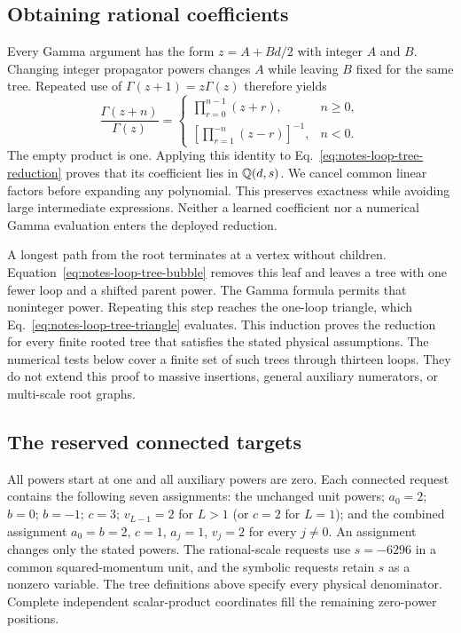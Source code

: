\subsection{Obtaining rational coefficients}
Every Gamma argument has the form $z=A+Bd/2$ with integer $A$ and $B$. Changing integer propagator powers changes $A$ while leaving $B$ fixed for the same tree. Repeated use of $\Gamma(z+1)=z\Gamma(z)$ therefore yields
\begin{equation}
 \frac{\Gamma(z+n)}{\Gamma(z)}=
 \begin{cases}
 \prod_{r=0}^{n-1}(z+r),&n\ge0,\\
 \displaystyle\left[\prod_{r=1}^{-n}(z-r)\right]^{-1},&n<0.
 \end{cases}
 \label{eq:notes-loop-tree-shift}
\end{equation}
The empty product is one. Applying this identity to Eq.~\eqref{eq:notes-loop-tree-reduction} proves that its coefficient lies in $\mathbb Q(d,s)$. We cancel common linear factors before expanding any polynomial. This preserves exactness while avoiding large intermediate expressions. Neither a learned coefficient nor a numerical Gamma evaluation enters the deployed reduction.

A longest path from the root terminates at a vertex without children. Equation~\eqref{eq:notes-loop-tree-bubble} removes this leaf and leaves a tree with one fewer loop and a shifted parent power. The Gamma formula permits that noninteger power. Repeating this step reaches the one-loop triangle, which Eq.~\eqref{eq:notes-loop-tree-triangle} evaluates. This induction proves the reduction for every finite rooted tree that satisfies the stated physical assumptions. The numerical tests below cover a finite set of such trees through thirteen loops. They do not extend this proof to massive insertions, general auxiliary numerators, or multi-scale root graphs.

\subsection{The reserved connected targets}
All powers start at one and all auxiliary powers are zero. Each connected request contains the following seven assignments: the unchanged unit powers; $a_0=2$; $b=0$; $b=-1$; $c=3$; $v_{L-1}=2$ for $L>1$ (or $c=2$ for $L=1$); and the combined assignment $a_0=b=2$, $c=1$, $a_j=1$, $v_j=2$ for every $j\ne0$. An assignment changes only the stated powers. The rational-scale requests use $s=-6296$ in a common squared-momentum unit, and the symbolic requests retain $s$ as a nonzero variable. The tree definitions above specify every physical denominator. Complete independent scalar-product coordinates fill the remaining zero-power positions.

